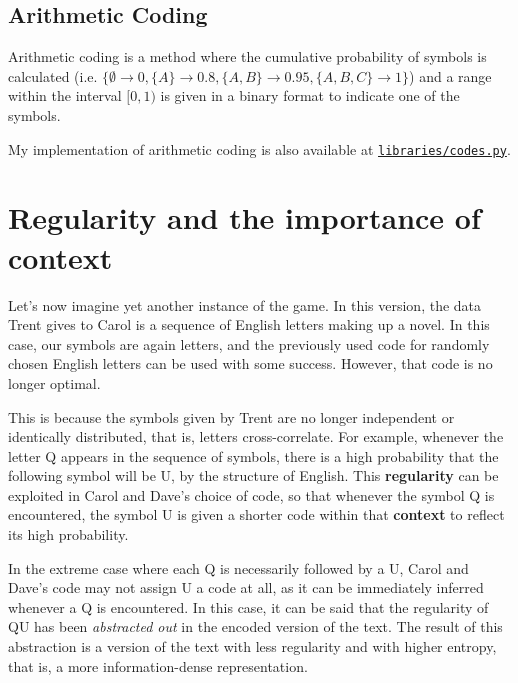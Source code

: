
\subsection{Arithmetic Coding}

Arithmetic coding is a method where the cumulative probability of symbols is calculated (i.e. $\{\emptyset \rightarrow 0, \{A\} \rightarrow 0.8, \{A,B\} \rightarrow 0.95, \{A,B,C\} \rightarrow 1\}$) and a range within the interval $[0,1)$ is given in a binary format to indicate one of the symbols.

My implementation of arithmetic coding is also available at \texttt{\href{https://github.com/Guy29/FYP/blob/main/Code/libraries/codes.py}{libraries/codes.py}}.


\section{Regularity and the importance of context}
\label{sec:regularity_and_context}

Let's now imagine yet another instance of the game. In this version, the data Trent gives to Carol is a sequence of English letters making up a novel. In this case, our symbols are again letters, and the previously used code for randomly chosen English letters can be used with some success. However, that code is no longer optimal.

This is because the symbols given by Trent are no longer independent or identically distributed, that is, letters cross-correlate. For example, whenever the letter Q appears in the sequence of symbols, there is a high probability that the following symbol will be U, by the structure of English. This \textbf{regularity} can be exploited in Carol and Dave's choice of code, so that whenever the symbol Q is encountered, the symbol U is given a shorter code within that \textbf{context} to reflect its high probability.

In the extreme case where each Q is necessarily followed by a U, Carol and Dave's code may not assign U a code at all, as it can be immediately inferred whenever a Q is encountered. In this case, it can be said that the regularity of QU has been \emph{abstracted out} in the encoded version of the text. The result of this abstraction is a version of the text with less regularity and with higher entropy, that is, a more information-dense representation.

